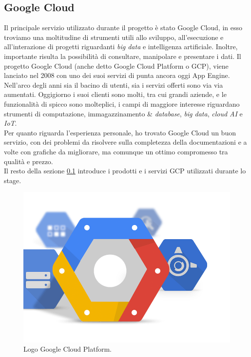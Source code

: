 \subsection{Google Cloud}\label{GoogleCloud}
Il principale servizio utilizzato durante il progetto è stato Google Cloud, in esso troviamo una moltitudine di strumenti utili allo sviluppo, all'esecuzione e all'interazione di progetti riguardanti \emph{big data} e intelligenza artificiale. Inoltre, importante risulta la possibilità di consultare, manipolare e presentare i dati.
Il progetto Google Cloud (anche detto Google Cloud Platform o GCP), viene lanciato nel 2008 con uno dei suoi servizi di punta ancora oggi  \Gls{App Engine}. Nell'arco degli anni sia il bacino di utenti, sia i servizi offerti sono via via aumentati. Oggigiorno i suoi clienti \cite{clienti} sono molti, tra cui grandi aziende, e le funzionalità di spicco sono molteplici, i campi di maggiore interesse riguardano strumenti di computazione, immagazzinamento \& \emph{database}, \emph{big data}, \emph{cloud AI} e \emph{IoT}.
\\
Per quanto riguarda l'esperienza personale, ho trovato Google Cloud un buon servizio, con dei problemi da risolvere sulla completezza della documentazioni e a volte con grafiche da migliorare, ma comunque un ottimo compromesso tra qualità e prezzo.
\\
Il resto della sezione \ref{GoogleCloud} introduce i prodotti e i servizi GCP utilizzati durante lo stage.
\begin{figure}[h!]
	\centering
	\includegraphics[scale=0.3]{figures/google-cloud-platform}
	\caption[Logo Google Cloud Platform.]{Logo Google Cloud Platform.
		\label{fig:logoGCP}}
\end{figure}	
